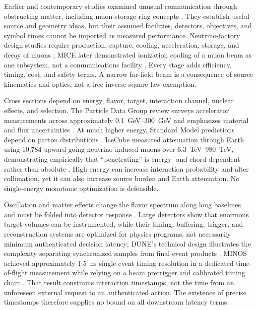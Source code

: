\documentclass[11pt]{article}
\begin{document}
Earlier and contemporary studies examined unusual communication through obstructing matter, including muon-storage-ring concepts \citep{Geer1998,Huber2010}. They establish useful source and geometry ideas, but their assumed facilities, detectors, objectives, and symbol times cannot be imported as measured performance. Neutrino-factory design studies require production, capture, cooling, acceleration, storage, and decay of muons \citep{IDSNF2011}; MICE later demonstrated ionization cooling of a muon beam as one subsystem, not a communications facility \citep{MICE2020}. Every stage adds efficiency, timing, cost, and safety terms. A narrow far-field beam is a consequence of source kinematics and optics, not a free inverse-square law exemption.

Cross sections depend on energy, flavor, target, interaction channel, nuclear effects, and selection. The Particle Data Group review surveys accelerator measurements across approximately \SIrange{0.1}{300}{\giga\electronvolt} and emphasizes material and flux uncertainties \citep{Zeller2024,PDG2024}. At much higher energy, Standard Model predictions depend on parton distributions \citep{CooperSarkar2011}. IceCube measured attenuation through Earth using 10,784 upward-going neutrino-induced muons over \SIrange{6.3}{980}{\tera\electronvolt}, demonstrating empirically that ``penetrating'' is energy- and chord-dependent rather than absolute \citep{IceCube2017}. High energy can increase interaction probability and alter collimation, yet it can also increase source burden and Earth attenuation. No single-energy monotonic optimization is defensible.

Oscillation and matter effects change the flavor spectrum along long baselines and must be folded into detector response \citep{GonzalezGarcia2024}. Large detectors show that enormous target volumes can be instrumented, while their timing, buffering, trigger, and reconstruction systems are optimized for physics programs, not necessarily minimum authenticated decision latency; DUNE's technical design illustrates the complexity separating synchronized samples from final event products \citep{Abi2020}. MINOS achieved approximately \SI{1.5}{\nano\second} single-event timing resolution in a dedicated time-of-flight measurement while relying on a beam pretrigger and calibrated timing chain \citep{MINOS2015}. That result constrains interaction timestamps, not the time from an unforeseen external request to an authenticated action. The existence of precise timestamps therefore supplies no bound on all downstream latency terms.
\end{document}
